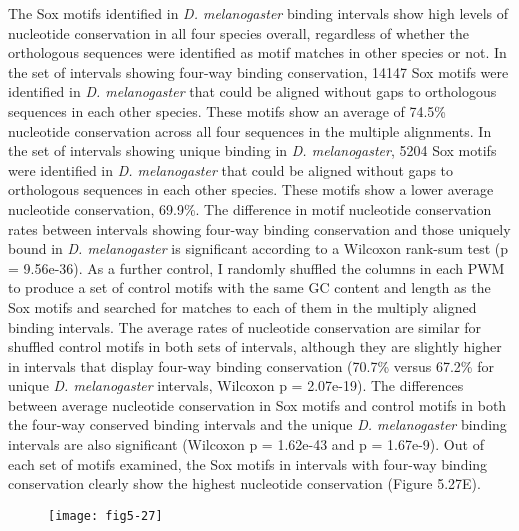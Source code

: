 The Sox motifs identified in \emph{D. melanogaster} binding intervals show high levels of nucleotide conservation in all four species overall, regardless of whether the orthologous sequences were identified as motif matches in other species or not. In the set of intervals showing four-way binding conservation, 14147 Sox motifs were identified in \emph{D. melanogaster} that could be aligned without gaps to orthologous sequences in each other species. These motifs show an average of 74.5\% nucleotide conservation across all four sequences in the multiple alignments. In the set of intervals showing unique binding in \emph{D. melanogaster}, 5204 Sox motifs were identified in \emph{D. melanogaster} that could be aligned without gaps to orthologous sequences in each other species. These motifs show a lower average nucleotide conservation, 69.9\%. The difference in motif nucleotide conservation rates between intervals showing four-way binding conservation and those uniquely bound in \emph{D. melanogaster} is significant according to a Wilcoxon rank-sum test (p = 9.56e-36). As a further control, I randomly shuffled the columns in each PWM to produce a set of control motifs with the same GC content and length as the Sox motifs and searched for matches to each of them in the multiply aligned binding intervals. The average rates of nucleotide conservation are similar for shuffled control motifs in both sets of intervals, although they are slightly higher in intervals that display four-way binding conservation (70.7\% versus 67.2\% for unique \emph{D. melanogaster} intervals, Wilcoxon p = 2.07e-19). The differences between average nucleotide conservation in Sox motifs and control motifs in both the four-way conserved binding intervals and the unique \emph{D. melanogaster} binding intervals are also significant (Wilcoxon p = 1.62e-43
 and p = 1.67e-9). Out of each set of motifs examined, the Sox motifs in intervals with four-way binding conservation clearly show the highest nucleotide conservation (Figure 5.27E).

\begin{figure}[H]
\centering
\texttt{[image: fig5-27]}
\label{Figure 5.27}
\end{figure}

